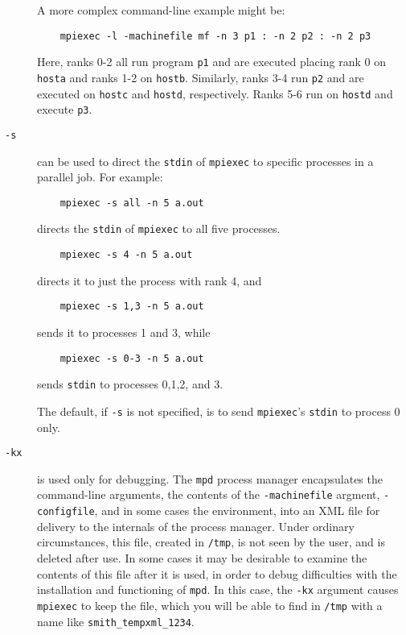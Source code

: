 \documentclass[dvipdfm,11pt]{article}
\begin{document}
\begin{description}
A more complex command-line example might be:
\begin{verbatim}
    mpiexec -l -machinefile mf -n 3 p1 : -n 2 p2 : -n 2 p3
\end{verbatim}
Here, ranks 0-2 all run program \texttt{p1} and are executed placing
rank 0 on \texttt{hosta} and ranks 1-2 on \texttt{hostb}.  Similarly,
ranks 3-4 run \texttt{p2} and are executed on \texttt{hostc} and
\texttt{hostd}, respectively.  Ranks 5-6 run on \texttt{hostd} and
execute \texttt{p3}.
\item[\texttt{-s}] can be used to direct the \texttt{stdin} of
  \texttt{mpiexec} to specific processes in a parallel job.  For
  example:
\begin{verbatim}
    mpiexec -s all -n 5 a.out
\end{verbatim}
directs the \texttt{stdin} of \texttt{mpiexec} to all five processes.
\begin{verbatim}
    mpiexec -s 4 -n 5 a.out 
\end{verbatim}
directs it to just the process with rank 4, and 
\begin{verbatim}
    mpiexec -s 1,3 -n 5 a.out 
\end{verbatim}
sends it to processes 1 and 3, while
\begin{verbatim}
    mpiexec -s 0-3 -n 5 a.out 
\end{verbatim}
sends \texttt{stdin} to processes 0,1,2, and 3.

The default, if \texttt{-s} is not specified, is to send
\texttt{mpiexec}'s \texttt{stdin} to process 0 only.

\item[\texttt{-kx}] is used only for debugging.  The \texttt{mpd}
  process manager encapsulates the command-line arguments, the contents
  of the \texttt{-machinefile} argment, \texttt{-configfile}, and in
  some cases the environment, into an XML file for delivery to the
  internals of the process manager.  Under ordinary circumstances, this
  file, created in \texttt{/tmp}, is not seen by the user, and is
  deleted after use.  In some cases it may be desirable to examine the
  contents of this file after it is used, in order to debug difficulties
  with the installation and functioning of \texttt{mpd}.  In this case,
  the \texttt{-kx} argument causes \texttt{mpiexec} to keep the file,
  which you will be able to find in \texttt{/tmp} with a name like
  \texttt{smith\_tempxml\_1234}.

\end{description}
\end{document}
